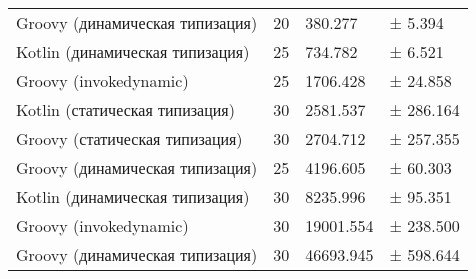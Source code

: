 \begin{table}[h]
\begin{center}
\begin{tabular}{|l|p{}|l|l|}
Groovy (динамическая типизация)         & 20 &  380.277 & ±   5.394\\
Kotlin (динамическая типизация)         & 25 &  734.782 & ±   6.521\\
Groovy (invokedynamic)                  & 25 & 1706.428 & ±  24.858\\
Kotlin (статическая типизация)          & 30 & 2581.537 & ± 286.164\\
Groovy (статическая типизация)          & 30 & 2704.712 & ± 257.355\\
Groovy (динамическая типизация)         & 25 & 4196.605 & ±  60.303\\
Kotlin (динамическая типизация)         & 30 & 8235.996 & ±  95.351\\
Groovy (invokedynamic)                  & 30 & 19001.554 & ± 238.500\\
Groovy (динамическая типизация)         & 30 & 46693.945 & ± 598.644\\
\hline
\end{tabular}
\end{center}
\end{table} 
    
    
    

